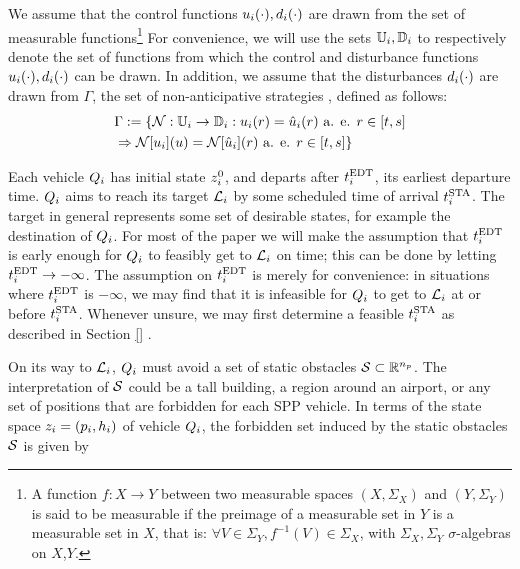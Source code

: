 We assume that the control functions $u_i(\cdot), d_i(\cdot)$ are drawn from the set of measurable functions\footnote{
A function $f:X\to Y$ between two measurable spaces $(X,\Sigma_X)$ and $(Y,\Sigma_Y)$ is said to be measurable if the preimage of a measurable set in $Y$ is a measurable set in $X$, that is: $\forall V\in\Sigma_Y, f^{-1}(V)\in\Sigma_X$, with $\Sigma_X,\Sigma_Y$ $\sigma$-algebras on $X$,$Y$.} For convenience, we will use the sets $\mathbb{U}_i, \mathbb{D}_i$ to respectively denote the set of functions from which the control and disturbance functions $u_i(\cdot), d_i(\cdot)$ can be drawn. In addition, we assume that the disturbances $d_i(\cdot)$ are drawn from $\Gamma$, the set of non-anticipative strategies \cite{Mitchell05}, defined as follows:
\begin{equation}
\begin{aligned}
& \Gamma := \{\mathcal{N}: \mathbb{U}_i \rightarrow \mathbb{D}_i:  u_i(r) = \hat{u}_i(r) \text{ a. e. } r\in[t,s] \\
& \Rightarrow \mathcal{N}[u_i](u) = \mathcal{N}[\hat{u}_i](r) \text{ a. e. } r\in[t,s]\}
\end{aligned}
\end{equation}

Each vehicle $Q_i$ has initial state $z^0_i$, and departs after $t^\text{EDT}_i$, its earliest departure time. $Q_i$ aims to reach its target $\mathcal{L}_i$ by some scheduled time of arrival $t^\text{STA}_i$. The target in general represents some set of desirable states, for example the destination of $Q_i$. For most of the paper we will make the assumption that $t^\text{EDT}_i$ is early enough for $Q_i$ to feasibly get to $\mathcal{L}_i$ on time; this can be done by letting $t^\text{EDT}_i \rightarrow -\infty$. The assumption on $t^\text{EDT}_i$ is merely for convenience: in situations where $t^\text{EDT}_i$ is $-\infty$, we may find that it is infeasible for $Q_i$ to get to $\mathcal{L}_i$ at or before $t^\text{STA}_i$. Whenever unsure, we may first determine a feasible $t^\text{STA}_i$ as described in Section \ref{} . 

On its way to $\mathcal{L}_i$, $Q_i$ must avoid a set of static obstacles $\mathcal{S} \subset \mathbb{R}^{n_p}$. The interpretation of $\mathcal{S}$ could be a tall building, a region around an airport, or any set of positions that are forbidden for each SPP vehicle. In terms of the state space $z_i = (p_i, h_i)$ of vehicle $Q_i$, the forbidden set induced by the static obstacles $\mathcal{S}$ is given by

